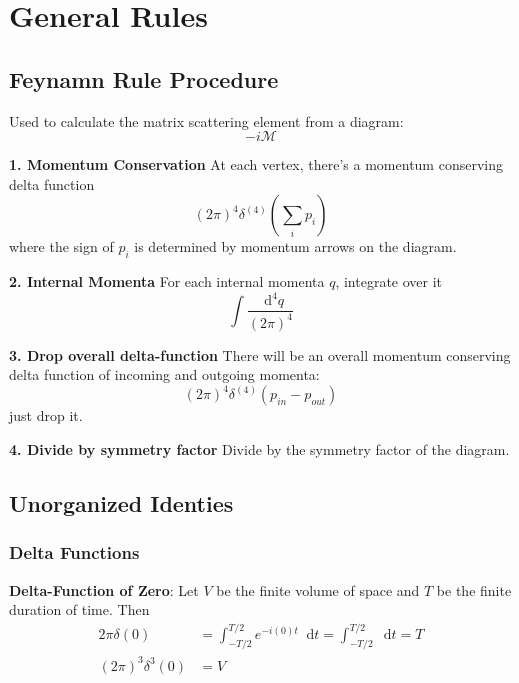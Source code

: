 \documentclass[12pt]{article}
\newcommand{\diff}{\mathop{}\!\mathrm{d}}
\theoremstyle{definition}
\begin{document}
\tableofcontents

\pagebreak

\section{General Rules}

\subsection{Feynamn Rule Procedure}

Used to calculate the matrix scattering element from a diagram:
\begin{equation*}
    -i \mathcal{M}
\end{equation*}

\textbf{1. Momentum Conservation} At each vertex, there's a momentum conserving delta function
\begin{equation*}
    (2\pi)^4 \delta^{(4)} \left( \sum_i p_i \right) 
\end{equation*}
where the sign of $p_i$ is determined by momentum arrows on the diagram.

\textbf{2. Internal Momenta} For each internal momenta $q$, integrate over it
\begin{equation*}
    \int \frac{\diff^4 q}{(2\pi)^4}
\end{equation*}

\textbf{3. Drop overall delta-function} There will be an overall momentum conserving delta function of
incoming and outgoing momenta:
\begin{equation*}
    (2\pi)^4 \delta^{(4)}(p_{in} - p_{out})
\end{equation*}
just drop it.

\textbf{4. Divide by symmetry factor} Divide by the symmetry factor of the diagram.

\subsection{Unorganized Identies}

\subsubsection{Delta Functions}
\textbf{Delta-Function of Zero}: Let $V$ be the finite volume of space and $T$ be the finite duration of time.
Then
\begin{equation*}
\begin{split}
    2\pi \delta(0)
        &= \int_{-T/2}^{T/2} e^{-i(0) t} \diff t = \int_{-T/2}^{T/2} \diff t = T \\
    (2\pi)^3 \delta^3(0) &= V \\
\end{split}
\end{equation*}
\end{document}
